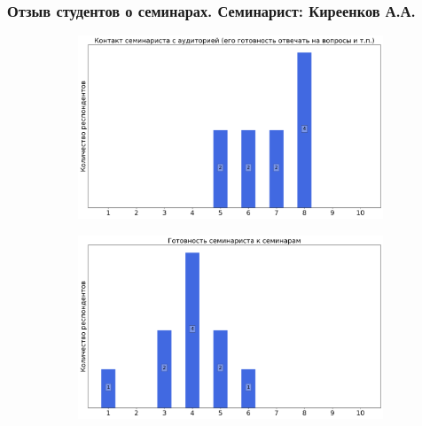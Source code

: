     \subsubsection{Отзыв студентов о семинарах. Семинарист: Киреенков А.А.}
        \begin{figure}[H]
            \centering
            \begin{subfigure}[b]{0.45\textwidth}
                \centering
                \includegraphics[width=\textwidth]{images/3 course/ТФКП/seminarists-marks-Киреенков А.А.-0.png}
            \end{subfigure}
            \begin{subfigure}[b]{0.45\textwidth}
                \centering
                \includegraphics[width=\textwidth]{images/3 course/ТФКП/seminarists-marks-Киреенков А.А.-1.png}
            \end{subfigure}
            \begin{subfigure}[b]{0.45\textwidth}
                \centering

\end{subfigure}
\end{figure}
